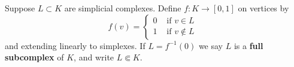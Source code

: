 \documentclass[12pt]{pset}
\newcommand{\fullsubcomplex}{\Subset}
\begin{document}
\begin{definition*}
  Suppose $L \subset K$ are simplicial complexes.  Define $f : K \to
  [0,1]$ on vertices by
  $$
f(v) = \begin{cases}
0 & \mbox{ if $v \in L$ } \\
1 & \mbox{ if $v \not\in L$ } 
\end{cases}
  $$
  and extending linearly to simplexes.  If $L = f^{-1}(0)$ we say $L$
  is a \textbf{full subcomplex} of $K$, and write $L \fullsubcomplex K$.
\end{definition*}
\end{document}
